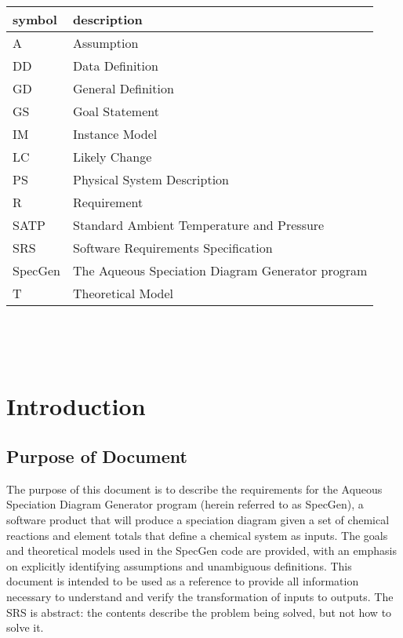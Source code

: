 \documentclass[12pt]{article}
\newcommand{\progname}{SpecGen} %
\begin{document}
\renewcommand{\arraystretch}{1.2}
\begin{tabular}{l l} 
  \toprule		
  \textbf{symbol} & \textbf{description}\\
  \midrule 
  A & Assumption\\
  DD & Data Definition\\
  GD & General Definition\\
  GS & Goal Statement\\
  IM & Instance Model\\
  LC & Likely Change\\
  PS & Physical System Description\\
  R & Requirement\\
  SATP & Standard Ambient Temperature and Pressure\\
  SRS & Software Requirements Specification\\
  \progname{} & The Aqueous Speciation Diagram Generator program\\
  T & Theoretical Model\\
  \bottomrule
\end{tabular}\\

\newpage

\tableofcontents

~\newpage


\setcounter{secnumdepth}{3}

\section{Introduction}

\subsection{Purpose of Document}
The purpose of this document is to describe the requirements for the Aqueous Speciation Diagram Generator program (herein referred to as \progname), a software product that will produce a speciation diagram given a set of chemical reactions and element totals that define a chemical system as inputs.  The goals and theoretical models used in the SpecGen code are provided, with an emphasis on explicitly identifying assumptions and unambiguous definitions. This document is intended to be used as a reference to provide all information necessary to understand and verify the transformation of inputs to outputs. The SRS is abstract: the contents describe the problem being solved, but not how to solve it.
\end{document}
